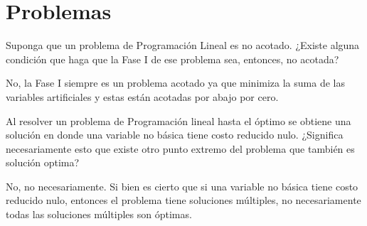 \documentclass{article}
\newenvironment{question}
{\begin{mdframed}[backgroundcolor=white]}
{\end{mdframed}}
\newenvironment{solution}
{\begin{mdframed}[backgroundcolor=lightorange,hidealllines=true]}
{\end{mdframed}}
\begin{document}
\section{Problemas}

\begin{question}
    Suponga que un problema de Programación Lineal es no acotado. ¿Existe alguna condición que haga que la Fase I de ese problema sea, entonces, no acotada?
\end{question}

\begin{solution}
    No, la Fase I siempre es un problema acotado ya que minimiza la suma de las variables artificiales y estas están acotadas por abajo por cero.
\end{solution}

\begin{question}
    Al resolver un problema de Programación lineal hasta el óptimo se obtiene una solución en donde una variable no básica tiene costo reducido nulo. ¿Significa necesariamente esto que existe otro punto extremo del problema que también es solución optima?
\end{question}

\begin{solution}
    No, no necesariamente. Si bien es cierto que si una variable no básica tiene costo reducido nulo, entonces el problema tiene soluciones múltiples, no necesariamente todas las soluciones múltiples son óptimas.
\end{solution}
\end{document}
